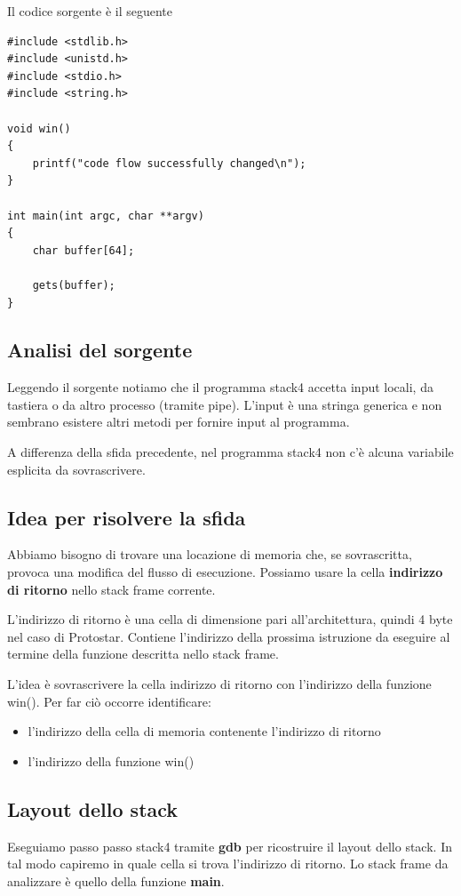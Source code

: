 Il codice sorgente è il seguente
\begin{lstlisting}[style=cstyle]
#include <stdlib.h>
#include <unistd.h>
#include <stdio.h>
#include <string.h>

void win()
{
    printf("code flow successfully changed\n");
}

int main(int argc, char **argv)
{
    char buffer[64];

    gets(buffer);
}
\end{lstlisting}

\subsection{Analisi del sorgente}
Leggendo il sorgente notiamo che il programma stack4 accetta input locali, da tastiera o da altro processo (tramite pipe). L'input è una stringa generica e non sembrano esistere altri metodi per fornire input al programma.

A differenza della sfida precedente, nel programma stack4 non c'è alcuna variabile esplicita da sovrascrivere.

\subsection{Idea per risolvere la sfida}
Abbiamo bisogno di trovare una locazione di memoria che, se sovrascritta, provoca una modifica del flusso di esecuzione. Possiamo usare la cella \textbf{indirizzo di ritorno} nello stack frame corrente.

L'indirizzo di ritorno è una cella di dimensione pari all'architettura, quindi 4 byte nel caso di Protostar. Contiene l'indirizzo della prossima istruzione da eseguire al termine della funzione descritta nello stack frame.

L'idea è sovrascrivere la cella indirizzo di ritorno con l'indirizzo della funzione win(). Per far ciò occorre identificare:
\begin{itemize}
    \item l'indirizzo della cella di memoria contenente l'indirizzo di ritorno
    \item l'indirizzo della funzione win()
\end{itemize}

\subsection{Layout dello stack}
Eseguiamo passo passo stack4 tramite \textbf{gdb} per ricostruire il layout dello stack. In tal modo capiremo in quale cella si trova l'indirizzo di ritorno. Lo stack frame da analizzare è quello della funzione \textbf{main}.

